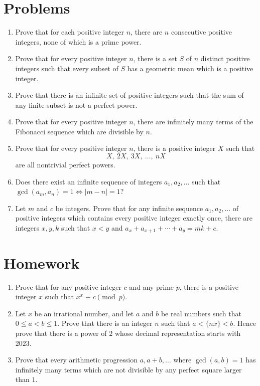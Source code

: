\documentclass{article}
\begin{document}
\section{Problems}
\begin{enumerate}
	\item Prove that for each positive integer $n$, there are $n$ consecutive
	      positive integers, none of which is a prime power.
	\item Prove that for every positive integer $n$, there is a set $S$ of $n$
	      distinct positive integers such that every subset of $S$ has a geometric
	      mean which is a positive integer.
	\item Prove that there is an infinite set of positive integers such that the
	      sum of any finite subset is not a perfect power.
	\item Prove that for every positive integer $n$, there are infinitely many
	      terms of the Fibonacci sequence which are divisible by $n$.
	\item Prove that for every positive integer $n$, there is a positive integer
	      $X$ such that \[X,\ 2X,\ 3X,\ \ldots,\ nX\] are all nontrivial perfect powers.
	\item Does there exist an infinite sequence of integers $a_1,a_2,\ldots$ such
	      that $\gcd(a_m,a_n)=1\iff |m-n|=1$?
	\item Let $m$ and $c$ be integers.
	      Prove that for any infinite sequence $a_1,a_2,\ldots$ of positive integers which
	      contains every positive integer exactly once, there
	      are integers $x,y,k$ such that $x<y$ and $a_x+a_{x+1}+\cdots+a_y=mk+c$.
\end{enumerate}
\newpage
\section{Homework}
\begin{enumerate}
	\item Prove that for any positive integer $c$ and any prime $p$, there is a
	      positive integer $x$ such that $x^x\equiv c\pmod p$.
	\item Let $x$ be an irrational number, and let $a$ and $b$ be real numbers
	      such that $0\le a<b\le 1$. Prove that there is an integer $n$ such that
	      $a<\{nx\}<b$. Hence prove that there is a power of $2$ whose decimal
	      representation starts with $2023$.
	\item Prove that every arithmetic progression $a,a+b,\ldots$ where
	      $\gcd(a,b)=1$ has infinitely many terms which are not divisible by any
	      perfect square larger than $1$.
\end{enumerate}
\end{document}
